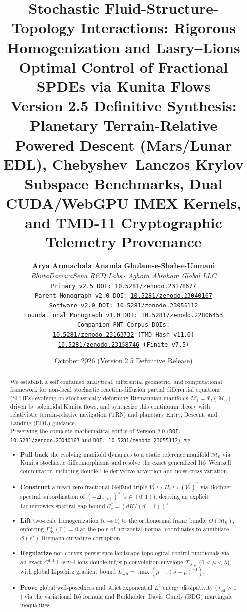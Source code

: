 \documentclass[11pt,a4paper,reqno]{article}
\title{\textbf{\Large Stochastic Fluid-Structure-Topology Interactions: Rigorous Homogenization and Lasry--Lions Optimal Control of Fractional SPDEs via Kunita Flows}\\[1.2ex]
\large \textbf{Version 2.5 Definitive Synthesis: Planetary Terrain-Relative Powered Descent (Mars/Lunar EDL), Chebyshev--Lanczos Krylov Subspace Benchmarks, Dual CUDA/WebGPU IMEX Kernels, and TMD-11 Cryptographic Telemetry Provenance}}
\author{
  \textbf{Arya Arunachala Ananda Ghulam-e-Shah-e-Unmani}\\
  \textit{BhutaDamaraSena R\&D Labs} $\cdot$ \textit{Aghora Abraham Global LLC}\\
  \texttt{Primary v2.5 DOI: \href{https://doi.org/10.5281/zenodo.23178677}{10.5281/zenodo.23178677}}\\
  \texttt{Parent Monograph v2.0 DOI: \href{https://doi.org/10.5281/zenodo.23040167}{10.5281/zenodo.23040167}}\\
  \texttt{Software v2.0 DOI: \href{https://doi.org/10.5281/zenodo.23055112}{10.5281/zenodo.23055112}}\\
  \texttt{Foundational Monograph v1.0 DOI: \href{https://doi.org/10.5281/zenodo.22806453}{10.5281/zenodo.22806453}}\\
  \texttt{Companion PNT Corpus DOIs:}\\
  \texttt{\href{https://doi.org/10.5281/zenodo.23163732}{10.5281/zenodo.23163732} (TMD-Hash v11.0)}\\
  \texttt{\href{https://doi.org/10.5281/zenodo.23158746}{10.5281/zenodo.23158746} (Finite v7.5)}
}
\date{October 2026 (Version 2.5 Definitive Release)}
\theoremstyle{definition}
\theoremstyle{remark}
\begin{document}
\maketitle

\begin{abstract}
\noindent We establish a self-contained analytical, differential-geometric, and computational framework for non-local stochastic reaction-diffusion partial differential equations (SPDEs) evolving on stochastically deforming Riemannian manifolds $\mathcal{M}_t = \Phi_t(\mathcal{M}_0)$ driven by solenoidal Kunita flows, and synthesize this continuum theory with relativistic terrain-relative navigation (TRN) and planetary Entry, Descent, and Landing (EDL) guidance.\\[1ex]
\noindent Preserving the complete mathematical edifice of Version 2.0 (\texttt{DOI: 10.5281/zenodo.23040167} and \texttt{DOI: 10.5281/zenodo.23055112}), we:
\begin{itemize}
    \setlength\itemsep{0em}
    \item[(i)] \textbf{Pull back} the evolving manifold dynamics to a static reference manifold $\mathcal{M}_0$ via Kunita stochastic diffeomorphisms and resolve the exact generalized It\^o--Wentzell commutator, including double Lie-derivative advection and noise cross-variation.
    \item[(ii)] \textbf{Construct} a mean-zero fractional Gelfand triple $\dot{V}_t^s \hookrightarrow \dot{H}_t \hookrightarrow (\dot{V}_t^s)^*$ via Bochner spectral subordination of $(-\Delta_{g(t)})^s$ ($s \in (0,1)$), deriving an explicit Lichnerowicz spectral gap bound $\mathcal{C}_s^* = (dK/(d-1))^s$.
    \item[(iii)] \textbf{Lift} two-scale homogenization ($\epsilon \to 0$) to the orthonormal frame bundle $O(\mathcal{M}_0)$, enforcing $\Gamma_{\beta\gamma}^\alpha(0) = 0$ at the pole of horizontal normal coordinates to annihilate $\mathcal{O}(\epsilon^2)$ Riemann curvature corruption.
    \item[(iv)] \textbf{Regularize} non-convex persistence landscape topological control functionals via an exact $C^{1,1}$ Lasry--Lions double inf/sup-convolution envelope $\mathcal{F}_{\lambda,\mu}$ ($0 < \mu < \lambda$) with global Lipschitz gradient bound $L_{\lambda,\mu} = \max(\mu^{-1}, (\lambda-\mu)^{-1})$.
    \item[(v)] \textbf{Prove} global well-posedness and strict exponential $L^2$ energy dissipativity ($\lambda_{\mathrm{eff}} > 0$) via the variational It\^o formula and Burkholder--Davis--Gundy (BDG) martingale inequalities.
\end{itemize}


\end{abstract}
\end{document}
